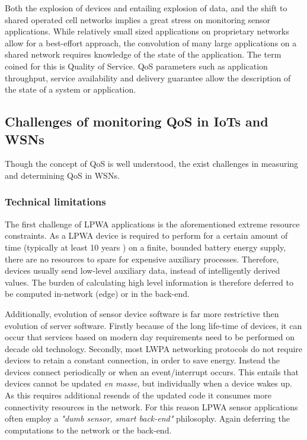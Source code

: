 Both the explosion of devices and entailing explosion of data, and the shift to shared operated cell networks implies a great stress on monitoring sensor applications. While relatively small sized applications on proprietary networks allow for a best-effort approach, the convolution of many large applications on a shared network requires knowledge of the state of the application. The term coined for this is Quality of Service. QoS parameters such as application throughput, service availability and delivery guarantee allow the description of the state of a system or application.

\subsection{Challenges of monitoring QoS in IoTs and WSNs}
Though the concept of QoS is well understood, the exist challenges in measuring and determining QoS in WSNs. 
\subsubsection{Technical limitations}
The first challenge of LPWA applications is the aforementioned extreme resource constraints. As a LPWA device is required to perform for a certain amount of time (typically at least 10 years \cite{???}) on a finite, bounded battery energy supply, there are no resources to spare for expensive auxiliary processes. Therefore, devices usually send low-level auxiliary data, instead of intelligently derived values. The burden of calculating high level information is therefore deferred to be computed in-network (edge) or in the back-end.

Additionally, evolution of sensor device software is far more restrictive then evolution of server software. Firstly because of the long life-time of devices, it can occur that services based on modern day requirements need to be performed on decade old technology. Secondly, most LWPA networking protocols do not require devices to retain a constant connection, in order to save energy\cite{tmobile, vodafone, iets met nbiot specs}. Instead the devices connect periodically or when an event/interrupt occurs. This entails that devices cannot be updated \emph{en masse}, but individually when a device wakes up. As this requires additional resends of the updated code it consumes more connectivity resources in the network. For this reason LPWA sensor applications often employ a \emph{"dumb sensor, smart back-end"} philosophy. Again deferring the computations to the network or the back-end.

